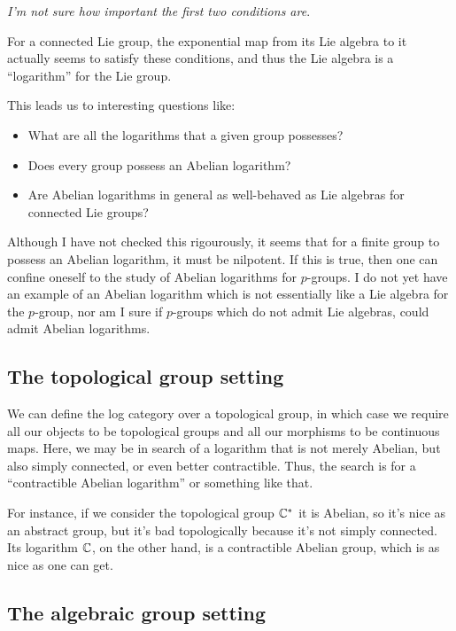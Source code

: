 \documentclass[a4paper]{amsart}
\begin{document}
{\em I'm not sure how important the first two conditions are}.

For a connected Lie group, the exponential map from its Lie algebra to
it actually seems to satisfy these conditions, and thus the Lie
algebra is a ``logarithm'' for the Lie group.

This leads us to interesting questions like:

\begin{itemize}

\item What are all the logarithms that a given group possesses?

\item Does every group possess an Abelian logarithm?

\item Are Abelian logarithms in general as well-behaved as Lie
  algebras for connected Lie groups?

\end{itemize}

Although I have not checked this rigourously, it seems that for a
finite group to possess an Abelian logarithm, it must be nilpotent.
If this is true, then one can confine oneself to the study of Abelian
logarithms for $p$-groups. I do not yet have an example of an Abelian
logarithm which is not essentially like a Lie algebra for the
$p$-group, nor am I sure if $p$-groups which do not admit Lie algebras,
could admit Abelian logarithms.

\subsection{The topological group setting}

We can define the log category over a topological group, in which case
we require all our objects to be topological groups and all our
morphisms to be continuous maps. Here, we may be in search of a
logarithm that is not merely Abelian, but also simply connected, or
even better contractible. Thus, the search is for a ``contractible
Abelian logarithm'' or something like that.

For instance, if we consider the topological group $\mathbb{C}^*$ it is
Abelian, so it's nice as an abstract group, but it's bad topologically
because it's not simply connected. Its logarithm $\mathbb{C}$, on the other
hand, is a contractible Abelian group, which is as nice as one can
get.

\subsection{The algebraic group setting}
\end{document}
